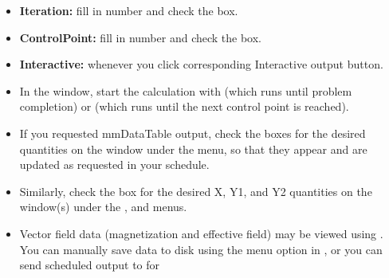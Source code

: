 \begin{list}{}{\setlength{\labelwidth}{0pt}
               \setlength{\leftmargin}{0pt}
               \setlength{\rightmargin}{\leftmargin}
               \setlength{\itemsep}{0pt}}
\begin{description}
\begin{itemize}
\begin{itemize}
\begin{enumerate}
\begin{itemize}
            \item {\bf Iteration:} fill in number and check the box.
            \item {\bf ControlPoint:} fill in number and check the box.
            \item {\bf Interactive:} whenever you click corresponding
                  Interactive output button.
          \end{itemize}
        \end{enumerate}
      \end{itemize}
    \end{itemize}
    \item[Start calculation:]\blankspace
    \begin{itemize}
      \item In the  window, start the calculation with
             (which runs until problem completion) or
             (which runs until the next control point is
            reached).
      \item If you requested mmDataTable output, check the boxes for the
            desired quantities on the
            window under
            the  menu, so that they appear and are updated as
            requested in your schedule.
      \item Similarly, check the box for the desired X, Y1, and Y2
            quantities on the
            window(s) under the ,  and  menus.
    \end{itemize}
    \item[Save and/or display results:]\blankspace
    \begin{itemize}
      \item Vector field data (magnetization and effective field) may be
            viewed using .  You can
            manually save data to disk using
            the  menu option in
            , or you can send scheduled output to
             for

\end{itemize}
\end{description}
\end{list}
